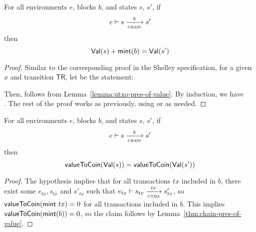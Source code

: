 \begin{theorem}
  \label{thm:chain-pres-of-value}
  For all environments $e$, blocks $b$, and states $s$, $s'$, if
  \begin{equation*}
    e\vdash s\trans{chain}{b}s'
  \end{equation*}
  then
  \begin{equation*}
    \mathsf{Val}(s) + \mathsf{mint}(b) = \mathsf{Val}(s')
  \end{equation*}
\end{theorem}
\begin{proof}
  Similar to the corresponding proof in the Shelley specification,
  for a given $x$ and transition $\mathsf{TR}$, let 
  be the statement:

  \noindent
  Then,  follows from
  Lemma~\ref{lemma:utxo-pres-of-value}.  By induction, we have \\
  . The rest of the proof works as
  previously, using  or  as needed.
\end{proof}

\begin{theorem}
  \label{thm:chain-pres-of-ada}
  For all environments $e$, blocks $b$, and states $s$, $s'$, if
  \begin{equation*}
    e\vdash s\trans{chain}{b}s'
  \end{equation*}
  then
  \begin{equation*}
    \mathsf{valueToCoin}(\mathsf{Val}(s)) = \mathsf{valueToCoin}(\mathsf{Val}(s'))
  \end{equation*}
\end{theorem}
\begin{proof}
  The hypothesis implies that for all transactions $tx$ included in
  $b$, there exist some $e_{tx}, s_{tx}$ and $s'_{tx}$ such that
  $e_{tx}\vdash s_{tx}\trans{utxo}{tx}s'_{tx}$, so
  $\mathsf{valueToCoin}(\mathsf{mint}~tx) = 0$ for all transactions included
  in $b$. This implies $\mathsf{valueToCoin}(\mathsf{mint}(b)) = 0$, so the
  claim follows by Lemma~\ref{thm:chain-pres-of-value}.
\end{proof}